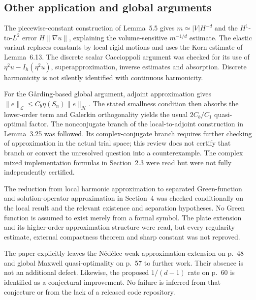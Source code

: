 \documentclass[10pt]{article}
\begin{document}
\subsection*{Other application and global arguments}
The piecewise-constant construction of Lemma 5.5 gives \(m\simeq |V|H^{-d}\) and the \(H^1\)-to-\(L^2\) error \(H\|\nabla u\|\), explaining the volume-sensitive \(m^{-1/d}\) estimate. The elastic variant replaces constants by local rigid motions and uses the Korn estimate of Lemma 6.13. The discrete scalar Caccioppoli argument was checked for its use of \(\eta^2u-I_h(\eta^2u)\), superapproximation, inverse estimates and absorption. Discrete harmonicity is not silently identified with continuous harmonicity.\par
For the Gårding-based global argument, adjoint approximation gives \(\|e\|_{\mathcal L}\le C_b\eta(S_n)\|e\|_{\mathcal H}\). The stated smallness condition then absorbs the lower-order term and Galerkin orthogonality yields the usual \(2C_b/C_1\) quasi-optimal factor. The nonconjugate branch of the local-to-adjoint construction in Lemma 3.25 was followed. Its complex-conjugate branch requires further checking of approximation in the actual trial space; this review does not certify that branch or convert the unresolved question into a counterexample. The complex mixed implementation formulas in Section 2.3 were read but were not fully independently certified.\par
The reduction from local harmonic approximation to separated Green-function and solution-operator approximation in Section 4 was checked conditionally on the local result and the relevant existence and separation hypotheses. No Green function is assumed to exist merely from a formal symbol. The plate extension and its higher-order approximation structure were read, but every regularity estimate, external compactness theorem and sharp constant was not reproved.\par
The paper explicitly leaves the Nédélec weak approximation extension on p. 48 and global Maxwell quasi-optimality on p. 57 to further work. Their absence is not an additional defect. Likewise, the proposed \(1/(d-1)\) rate on p. 60 is identified as a conjectural improvement. No failure is inferred from that conjecture or from the lack of a released code repository.\par
\end{document}
